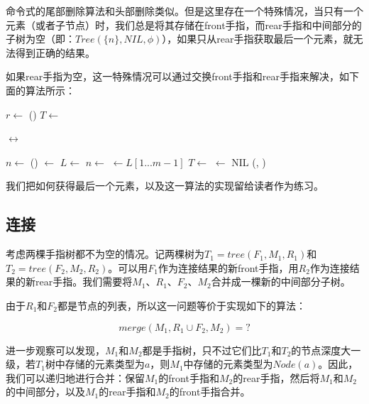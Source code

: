 \documentclass[b5paper]{ctexart}
\begin{document}
命令式的尾部删除算法和头部删除类似。但是这里存在一个特殊情况，当只有一个元素（或者子节点）时，我们总是将其存储在front手指，而rear手指和中间部分的子树为空（即：$Tree(\{n\}, NIL, \phi)$），如果只从rear手指获取最后一个元素，就无法得到正确的结果。

如果rear手指为空，这一特殊情况可以通过交换front手指和rear手指来解决，如下面的算法所示：

\begin{algorithmic}
  \State $r \gets$ ()
  \State {}
    \State $T \gets$ 
  \EndWhile

    \State {}  $\leftrightarrow$ 
  \EndIf

  \State $n \gets $ ()
  \State {} $\gets$ 
  \Repeat
    \State $L \gets$  
    \State $n \gets$  
    \State {} $\gets L[1...m-1]$ 
    \State $T \gets $ 
      \State {} $\gets$ NIL
    \EndIf
  \State \Return (, )
\EndFunction
\end{algorithmic}

我们把如何获得最后一个元素，以及这一算法的实现留给读者作为练习。

\subsection{连接}

考虑两棵手指树都不为空的情况。记两棵树为$T_1 = tree(F_1, M_1, R_1)$和$T_2 = tree(F_2, M_2, R_2)$。可以用$F_1$作为连接结果的新front手指，用$R_2$作为连接结果的新rear手指。我们需要将$M_1$、$R_1$、$F_2$、$M_2$合并成一棵新的中间部分子树。

由于$R_1$和$F_2$都是节点的列表，所以这一问题等价于实现如下的算法：

\[
merge(M_1, R_1 \cup F_2, M_2) = ?
\]

进一步观察可以发现，$M_1$和$M_2$都是手指树，只不过它们比$T_1$和$T_2$的节点深度大一级，若$T_1$树中存储的元素类型为$a$，则$M_1$中存储的元素类型为$Node(a)$。因此，我们可以递归地进行合并：保留$M_1$的front手指和$M_2$的rear手指，然后将$M_1$和$M_2$的中间部分，以及$M_1$的rear手指和$M_2$的front手指合并。
\end{document}
